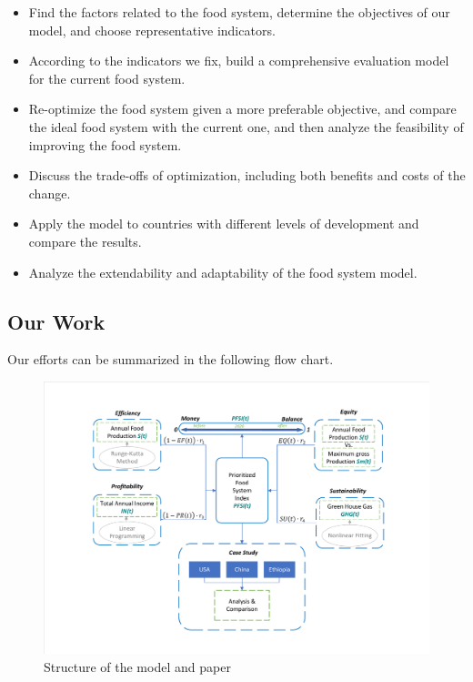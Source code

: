 \documentclass[12pt]{article}
\begin{document}
\begin{itemize}
    \item Find the factors related to the food system, determine the objectives of our model, and choose representative indicators.
    \item According to the indicators we fix, build a comprehensive evaluation model for the current food system.
    \item Re-optimize the food system given a more preferable objective, and compare the ideal food system with the current one, and then analyze the feasibility of improving the food system.
    \item Discuss the trade-offs of optimization, including both benefits and costs of the change.
    \item Apply the model to countries with different levels of development and compare the results.
    \item Analyze the extendability and adaptability of the food system model. 
\end{itemize}

\vspace{-1em}
\subsection{Our Work}
Our efforts can be summarized in the following flow chart.
\begin{figure}[H]
    \centering
    \includegraphics[width = 1\textwidth]{figure/procedure.pdf}
    \caption{Structure of the model and paper}
    \label{procedure}
\end{figure}
\end{document}
